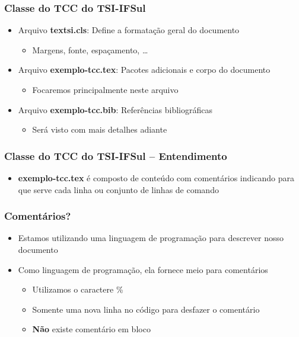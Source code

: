 \begin{frame} \frametitle{Classe do TCC do TSI-IFSul}
\begin{itemize}
	\item Arquivo \textbf{textsi.cls}: Define a formatação geral do documento
	\begin{itemize}
		\item Margens, fonte, espaçamento, \ldots
	\end{itemize}
	\item Arquivo \textbf{exemplo-tcc.tex}: Pacotes adicionais e corpo do documento
	\begin{itemize}
		\item Focaremos principalmente neste arquivo
	\end{itemize}
	\item Arquivo \textbf{exemplo-tcc.bib}: Referências bibliográficas
	\begin{itemize}
		\item Será visto com mais detalhes adiante
	\end{itemize}
\end{itemize}
\end{frame}

\begin{frame} \frametitle{Classe do TCC do TSI-IFSul -- Entendimento}
\begin{itemize}
	\item \textbf{exemplo-tcc.tex} é composto de conteúdo com comentários indicando para que serve cada linha ou conjunto de linhas de comando
\end{itemize}
\end{frame}

\begin{frame} \frametitle{Comentários?}
\begin{itemize}
	\item Estamos utilizando uma linguagem de programação para descrever nosso documento
	\item Como linguagem de programação, ela fornece meio para comentários
	\begin{itemize}
		\item Utilizamos o caractere \%
		\item Somente uma nova linha no código para desfazer o comentário
		\item \textbf{Não} existe comentário em bloco
	\end{itemize}
\end{itemize}
\end{frame}